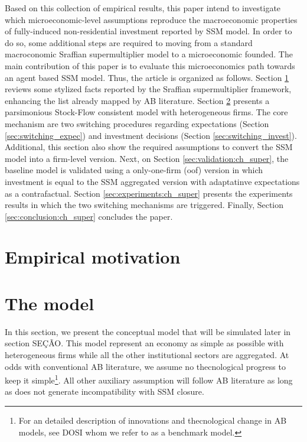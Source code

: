 \documentclass[12pt,openright,oneside,a4paper,english,sumario=tradicional]{gpsabntex}
\numberwithin{listing}{chapter}
\begin{document}
Based on this collection of empirical results, this paper intend to investigate which microeconomic-level assumptions reproduce the macroeconomic properties of fully-induced non-residential investment reported by SSM model.
In order to do so, some additional steps are required to moving from a standard macroconomic Sraffian supermultiplier model to a microeconomic founded.
The main contribution of this paper is to evaluate this microeconomics path towards an agent based SSM model.
Thus, the article is organized as follows.
Section \ref{sec:empirical:ch_super} reviews some stylized facts reported by the Sraffian supermultiplier framework, enhancing the list already mapped by AB literature.
Section \ref{sec:model:ch_super} presents a parsimonious Stock-Flow consistent model with heterogeneous firms.
The core mechanism are two switching procedures regarding expectations (Section \ref{sec:switching_expec}) and investment decisions (Section \ref{sec:switching_invest}).
Additional, this section also show the required assumptions to convert the SSM model into a firm-level version.
Next, on Section \ref{sec:validation:ch_super}, the baseline model is validated using a only-one-firm (oof) version in which investment is equal to the SSM aggregated version with adaptatinve expectations as a contrafactual.
Section \ref{sec:experiments:ch_super} presents the experiments results in which the two switching mechanisms are triggered.
Finally, Section \ref{sec:conclusion:ch_super} concludes the paper.


\section{Empirical motivation}
\label{sec:empirical:ch_super}
\section{The model}
\label{sec:model:ch_super}
In this section, we present the conceptual model that will be simulated later in section SEÇÃO.
This model represent an economy as simple as possible with heterogeneous firms while all the other institutional sectors are aggregated.
At odds with conventional AB literature, we assume no thecnological progress to keep it simple\footnote{For an detailed description of innovations and thecnological change in AB models, see DOSI whom we refer to as a benchmark model.}.
All other auxiliary assumption will follow AB literature as long as does not generate incompatibility with SSM closure.
\end{document}
